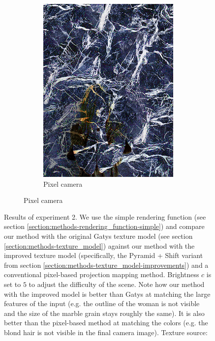 \begin{figure}[]
\begin{subfigure}{\textwidth}
\begin{subfigure}{0.24\textwidth}
            \includegraphics[width=\textwidth]{images/04-experiment02/human/marble/pixel_proj.jpg}
            \caption{Pixel camera}
            \label{fig:ex02-human-marble-pixel_proj}
        \end{subfigure}
    \end{subfigure}
    \caption{Results of experiment 2. We use the simple rendering function (see section \ref{section:methods-rendering_function-simple}) and compare our method with the original Gatys texture model (see section \ref{section:methods-texture_model}) against our method with the improved texture model (specifically, the Pyramid + Shift variant from section \ref{section:methods-texture_model-improvements}) and a conventional pixel-based projection mapping method. Brightness \(c\) is set to \(5\) to adjust the difficulty of the scene. Note how our method with the improved model is better than Gatys at matching the large features of the input (e.g. the outline of the woman is not visible and the size of the marble grain stays roughly the same). It is also better than the pixel-based method at matching the colors (e.g. the blond hair is not visible in the final camera image). Texture source: \citet{Pixar128}}
    \label{fig:ex02-human-marble}
\end{figure}

